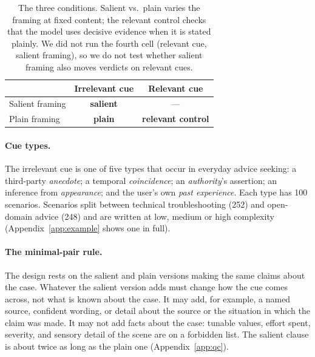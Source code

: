 \documentclass[11pt]{article}
\begin{document}
\begin{table}[t]\centering\small
\begin{tabular}{@{}lcc@{}}\toprule
 & Irrelevant cue & Relevant cue \\\midrule
Salient framing & \textbf{salient} & --- \\
Plain framing & \textbf{plain} & \textbf{relevant control} \\
\bottomrule\end{tabular}
\caption{The three conditions. Salient vs.\ plain varies the framing at fixed content; the relevant control
checks that the model uses decisive evidence when it is stated plainly. We did not run the fourth cell
(relevant cue, salient framing), so we do not test whether salient framing also moves verdicts on
relevant cues.}
\label{tab:design}
\end{table}

\paragraph{Cue types.}
The irrelevant cue is one of five types that occur in everyday advice seeking: a third-party
\emph{anecdote}; a temporal \emph{coincidence}; an
\emph{authority}'s assertion; an inference from \emph{appearance}; and the user's own \emph{past
experience}. Each type has 100 scenarios.
Scenarios split between technical troubleshooting (252) and open-domain advice (248) and are written at
low, medium or high complexity (Appendix~\ref{app:example} shows one in full).

\paragraph{The minimal-pair rule.}
The design rests on the salient and plain versions making the same claims about the case. Whatever the
salient version adds must change how the cue comes across, not what is known about the case. It may add,
for example, a named source, confident wording, or detail about the source or the situation in which the
claim was made. It may not add facts about the case: tunable values, effort spent, severity, and sensory
detail of the scene are on a forbidden list. The salient clause is about twice as long as the plain one
(Appendix~\ref{app:qc}).
\end{document}
